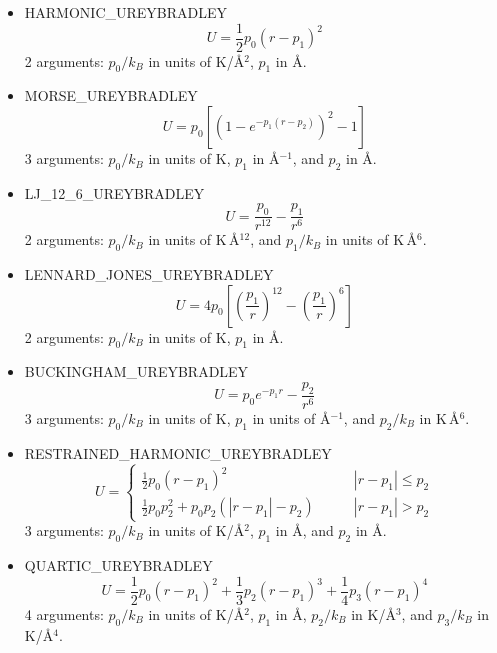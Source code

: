 \begin{itemize}

  \item{HARMONIC\_UREYBRADLEY}
  \begin{equation}
  U=\frac{1}{2} p_0 \left(r-p_1\right)^2
  \end{equation}
  2 arguments: $p_0/k_B$ in units of K/\AA$^2$, $p_1$ in \AA.

  \item{MORSE\_UREYBRADLEY}
  \begin{equation}
  U=p_0\left[\left(1-e^{-p_1\left(r-p_2\right)}\right)^2-1\right]
  \end{equation}
  3 arguments: $p_0/k_B$ in units of K, $p_1$ in \AA$^{-1}$, and $p_2$ in \AA.

  \item{LJ\_12\_6\_UREYBRADLEY}
  \begin{equation}
  U=\frac{p_0}{r^{12}}-\frac{p_1}{r^{6}}
  \end{equation}
  2 arguments: $p_0/k_B$ in units of K\,\AA$^{12}$, and $p_1/k_B$ in units of K\,\AA$^6$.

  \item{LENNARD\_JONES\_UREYBRADLEY}
  \begin{equation}
  U=4 p_0 \left[\left(\frac{p_1}{r}\right)^{12}-\left(\frac{p_1}{r}\right)^{6}\right]
  \end{equation}
  2 arguments: $p_0/k_B$ in units of K, $p_1$ in \AA.

  \item{BUCKINGHAM\_UREYBRADLEY}
  \begin{equation}
  U=p_0 e^{-p_1 r}-\frac{p_2}{r^{6}}
  \end{equation}
  3 arguments: $p_0/k_B$ in units of K, $p_1$ in units of \AA$^{-1}$, and $p_2/k_B$ in K\,\AA$^6$.

  \item{RESTRAINED\_HARMONIC\_UREYBRADLEY}
  \begin{equation}
  U=\begin{cases}
      \frac{1}{2} p_0\left(r-p_1\right)^2 & \qquad \left|r-p_1\right|\leq p_2\\
      \frac{1}{2} p_0 p_2^2+p_0 p_2\left(\left|r-p_1\right|-p_2\right) & \qquad \left|r-p_1\right|> p_2
     \end{cases}
  \end{equation}
  3 arguments: $p_0/k_B$ in units of K/\AA$^2$, $p_1$ in \AA, and $p_2$ in \AA.

  \item{QUARTIC\_UREYBRADLEY}
  \begin{equation}
  U=\frac{1}{2} p_0 \left(r-p_1\right)^2+ \frac{1}{3} p_2 \left(r-p_1\right)^3+ \frac{1}{4} p_3 \left(r-p_1\right)^4
  \end{equation}
  4 arguments: $p_0/k_B$ in units of K/\AA$^2$, $p_1$ in \AA, $p_2/k_B$ in K/\AA$^3$, and $p_3/k_B$ in K/\AA$^4$.


\end{itemize}
